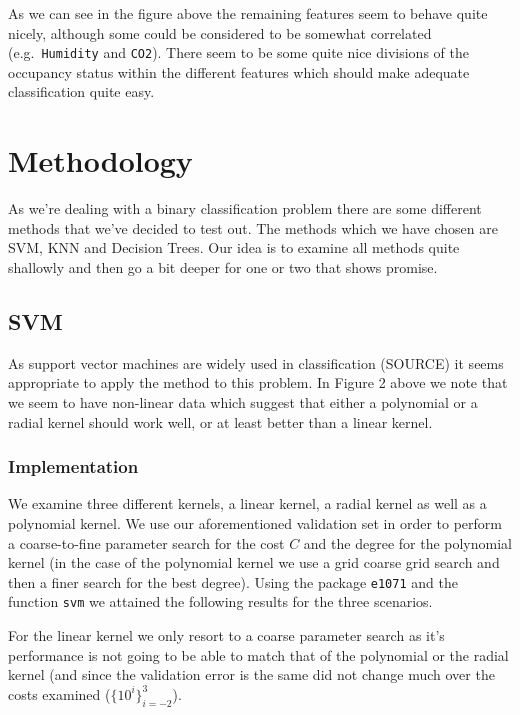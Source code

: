 \documentclass[
]{article}
\begin{document}
As we can see in the figure above the remaining features seem to behave
quite nicely, although some could be considered to be somewhat
correlated (e.g.~\texttt{Humidity} and \texttt{CO2}). There seem to be
some quite nice divisions of the occupancy status within the different
features which should make adequate classification quite easy.

\hypertarget{methodology}{%
\section{Methodology}\label{methodology}}

As we're dealing with a binary classification problem there are some
different methods that we've decided to test out. The methods which we
have chosen are SVM, KNN and Decision Trees. Our idea is to examine all
methods quite shallowly and then go a bit deeper for one or two that
shows promise.

\hypertarget{svm}{%
\subsection{SVM}\label{svm}}

As support vector machines are widely used in classification (SOURCE) it
seems appropriate to apply the method to this problem. In Figure 2 above
we note that we seem to have non-linear data which suggest that either a
polynomial or a radial kernel should work well, or at least better than
a linear kernel.

\hypertarget{implementation}{%
\subsubsection{Implementation}\label{implementation}}

We examine three different kernels, a linear kernel, a radial kernel as
well as a polynomial kernel. We use our aforementioned validation set in
order to perform a coarse-to-fine parameter search for the cost \(C\)
and the degree for the polynomial kernel (in the case of the polynomial
kernel we use a grid coarse grid search and then a finer search for the
best degree). Using the package \texttt{e1071} and the function
\texttt{svm} we attained the following results for the three scenarios.

For the linear kernel we only resort to a coarse parameter search as
it's performance is not going to be able to match that of the polynomial
or the radial kernel (and since the validation error is the same did not
change much over the costs examined (\(\{10^{i}\}_{i=-2}^3\)).
\end{document}

